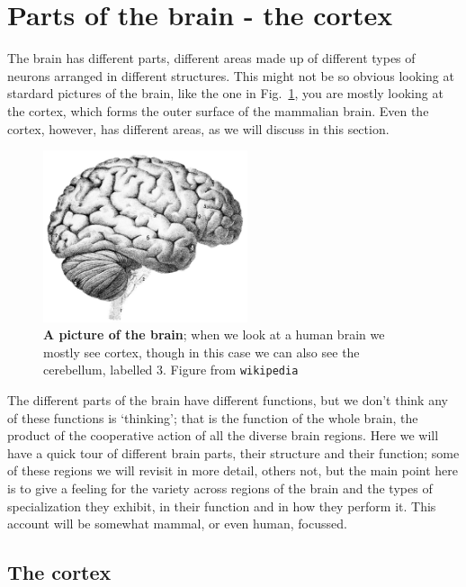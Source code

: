 \documentclass[12pt]{article}
\begin{document}
\section*{Parts of the brain - the cortex}

The brain has different parts, different areas made up of different
types of neurons arranged in different structures. This might not be
so obvious looking at stardard pictures of the brain, like the one in
Fig.~\ref{fig_brain}, you are mostly looking at the cortex, which
forms the outer surface of the mammalian brain. Even the cortex,
however, has different areas, as we will discuss in this section.

\begin{figure}[tbhp]
  \begin{center}
  \includegraphics[width=6cm]{brain.jpg}
\end{center}
  \caption{\textbf{A picture of the brain}; when we look at a human
    brain we mostly see cortex, though in this case we can also see
    the cerebellum, labelled 3. Figure from
    \texttt{wikipedia}\label{fig_brain}}
\end{figure}

The different parts of the brain have different functions, but we
don't think any of these functions is `thinking'; that is the function
of the whole brain, the product of the cooperative action of all the
diverse brain regions. Here we will have a quick tour of different
brain parts, their structure and their function; some of these regions
we will revisit in more detail, others not, but the main point here is
to give a feeling for the variety across regions of the brain and the
types of specialization they exhibit, in their function and in how
they perform it. This account will be somewhat mammal, or even human,
focussed.

\subsection*{The cortex}
\end{document}
